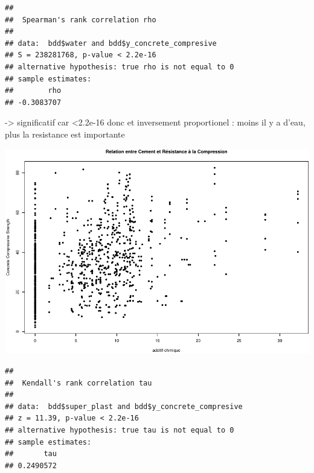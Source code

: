 \documentclass[
  12pt,
]{article}
\newenvironment{Shaded}{\begin{snugshade}}{\end{snugshade}}
\newcommand{\AttributeTok}[1]{\textcolor[rgb]{0.13,0.29,0.53}{#1}}
\newcommand{\FunctionTok}[1]{\textcolor[rgb]{0.13,0.29,0.53}{\textbf{#1}}}
\newcommand{\NormalTok}[1]{#1}
\newcommand{\SpecialCharTok}[1]{\textcolor[rgb]{0.81,0.36,0.00}{\textbf{#1}}}
\newcommand{\StringTok}[1]{\textcolor[rgb]{0.31,0.60,0.02}{#1}}
\begin{document}
\begin{verbatim}
## 
##  Spearman's rank correlation rho
## 
## data:  bdd$water and bdd$y_concrete_compresive
## S = 238281768, p-value < 2.2e-16
## alternative hypothesis: true rho is not equal to 0
## sample estimates:
##        rho 
## -0.3083707
\end{verbatim}

-\textgreater{} significatif car \textless2.2e-16 donc et inversement
proportionel : moins il y a d'eau, plus la resistance est importante

\begin{center}\includegraphics{rmd_final_files/figure-latex/unnamed-chunk-11-1} \end{center}

\begin{Shaded}
\end{Shaded}

\begin{verbatim}
## 
##  Kendall's rank correlation tau
## 
## data:  bdd$super_plast and bdd$y_concrete_compresive
## z = 11.39, p-value < 2.2e-16
## alternative hypothesis: true tau is not equal to 0
## sample estimates:
##       tau 
## 0.2490572
\end{verbatim}
\end{document}
